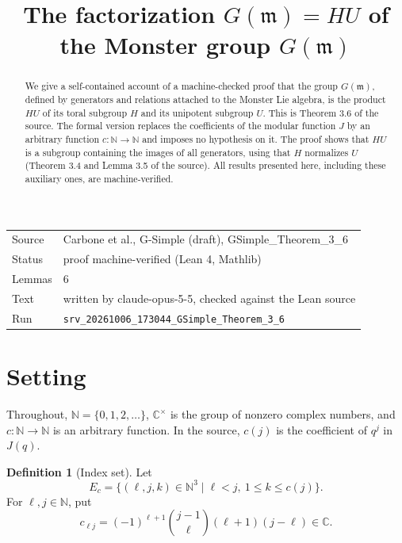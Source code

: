 \documentclass[11pt]{article}
\title{The factorization $G(\mathfrak{m}) = HU$ of the Monster group $G(\mathfrak{m})$}
\date{}
\theoremstyle{definition}
\newtheorem{definition}[theorem]{Definition}
\theoremstyle{remark}
\newcommand{\Cx}{\mathbb{C}^{\times}}
\begin{document}
\maketitle
\begin{abstract}
We give a self-contained account of a machine-checked proof that the group $G(\mathfrak{m})$, defined by generators and relations attached to the Monster Lie algebra, is the product $HU$ of its toral subgroup $H$ and its unipotent subgroup $U$. This is Theorem 3.6 of the source. The formal version replaces the coefficients of the modular function $J$ by an arbitrary function $c\colon\mathbb{N}\to\mathbb{N}$ and imposes no hypothesis on it. The proof shows that $HU$ is a subgroup containing the images of all generators, using that $H$ normalizes $U$ (Theorem 3.4 and Lemma 3.5 of the source). All results presented here, including these auxiliary ones, are machine-verified.
\end{abstract}

\begin{center}\small
\begin{tabular}{@{}ll@{}}
\toprule
Source & Carbone et al., G-Simple (draft), GSimple\_Theorem\_3\_6 \\
Status & proof machine-verified (Lean 4, Mathlib) \\
Lemmas & 6 \\
Text & written by claude-opus-5-5, checked against the Lean source \\
Run & \texttt{srv\_20261006\_173044\_GSimple\_Theorem\_3\_6} \\
\bottomrule
\end{tabular}
\end{center}

\tableofcontents

\section{Setting}

Throughout, $\mathbb{N}=\{0,1,2,\dots\}$, $\Cx$ is the group of nonzero complex numbers, and $c\colon \mathbb{N}\to\mathbb{N}$ is an arbitrary function. In the source, $c(j)$ is the coefficient of $q^j$ in $J(q)$.

\begin{definition}[Index set]
Let
\[
E_c=\{(\ell,j,k)\in\mathbb{N}^3 \mid \ell<j,\ 1\le k\le c(j)\}.
\]
For $\ell,j\in\mathbb{N}$, put
\[
c_{\ell j}=(-1)^{\ell+1}\binom{j-1}{\ell}(\ell+1)(j-\ell)\in\mathbb{C}.
\]
\end{definition}
\end{document}
